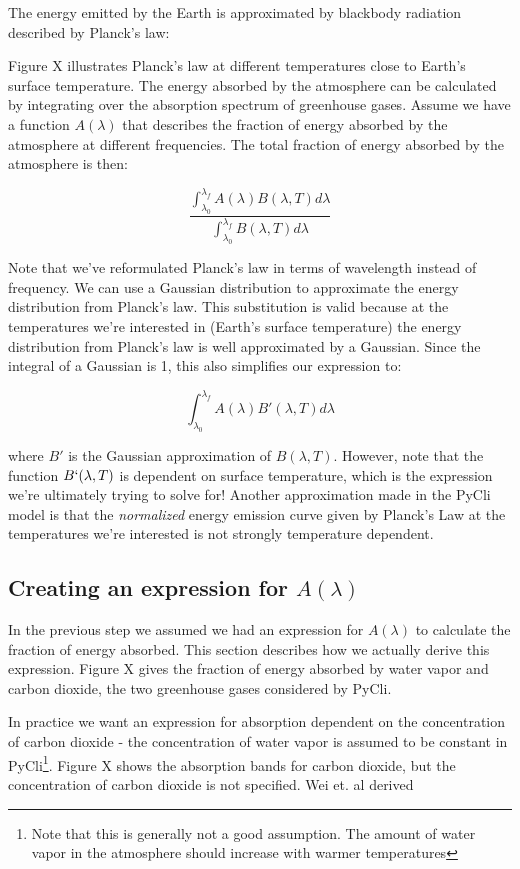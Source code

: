 \documentclass[12pt]{article} %
\begin{document}
The energy emitted by the Earth is approximated by blackbody radiation described by Planck's law:

Figure X illustrates Planck's law at different temperatures close to Earth's surface temperature. The energy absorbed by the atmosphere can be calculated by integrating over the absorption spectrum of greenhouse gases. Assume we have a function $A(\lambda)$ that describes the fraction of energy absorbed by the atmosphere at different frequencies. The total fraction of energy absorbed by the atmosphere is then:

$$\frac{\int_{\lambda_0}^{\lambda_f} A(\lambda) B(\lambda, T) d\lambda}{\int_{\lambda_0}^{\lambda_f} B(\lambda, T) d\lambda }$$

Note that we've reformulated Planck's law in terms of wavelength instead of frequency. We can use a Gaussian distribution to approximate the energy distribution from Planck's law. This substitution is valid because at the temperatures we're interested in (Earth's surface temperature) the energy distribution from Planck's law is well approximated by a Gaussian. Since the integral of a Gaussian is 1, this also simplifies our expression to:

$$\int_{\lambda_0}^{\lambda_f} A(\lambda) B'(\lambda, T) d\lambda$$

where $B'$ is the Gaussian approximation of $B(\lambda, T)$. However, note that the function $B`(\lambda, T)$ is dependent on surface temperature, which is the expression we're ultimately trying to solve for! Another approximation made in the PyCli model is that the \textit{normalized} energy emission curve given by Planck's Law at the temperatures we're interested is not strongly temperature dependent.

\subsection{Creating an expression for $A(\lambda)$}

In the previous step we assumed we had an expression for $A(\lambda)$ to calculate the fraction of energy absorbed. This section describes how we actually derive this expression. Figure X gives the fraction of energy absorbed by water vapor and carbon dioxide, the two greenhouse gases considered by PyCli.

In practice we want an expression for absorption dependent on the concentration of carbon dioxide - the concentration of water vapor is assumed to be constant in PyCli\footnote{Note that this is generally not a good assumption. The amount of water vapor in the atmosphere should increase with warmer temperatures}. Figure X shows the absorption bands for carbon dioxide, but the concentration of carbon dioxide is not specified. Wei et. al derived 
\end{document}
